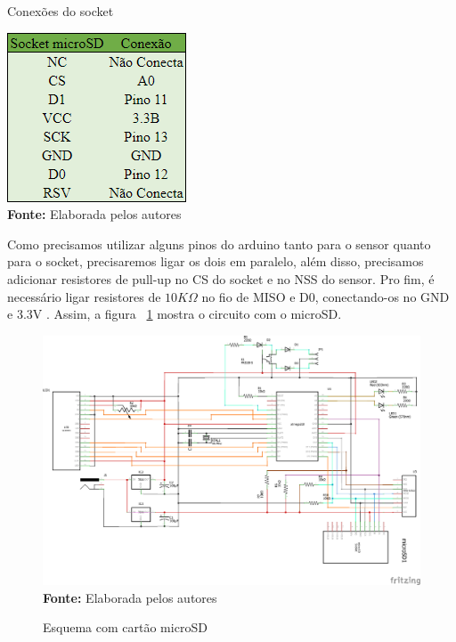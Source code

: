 \FloatBarrier
\begin{table}[!htbp]
	\centering
	\caption{Conexões do socket}
	\includegraphics[scale=.7]{imagens/microsdpinout}
	\\ \vspace{0.2cm}
	\textbf{Fonte:} Elaborada pelos autores
	\label{tab:socketpinout}
\end{table}
\FloatBarrier

Como precisamos utilizar alguns pinos do arduino tanto
para o sensor quanto para o socket, precisaremos ligar
os dois em paralelo, além disso, precisamos adicionar
resistores de pull-up no CS do socket e no NSS do sensor.
Pro fim, é necessário ligar resistores de $10K\Omega$
no fio de MISO e D0, conectando-os no GND e 3.3V \cite{paul2014}. Assim,
a figura ~\ref{fig:esquemasd} mostra o circuito com o microSD.

\FloatBarrier
\begin{figure}[!htbp]
	\centering
	\caption{Esquema com cartão microSD}
	\includegraphics[scale=.7]{imagens/esquemasd}
	\\\textbf{Fonte:} Elaborada pelos autores
	\label{fig:esquemasd}
\end{figure}
\FloatBarrier

